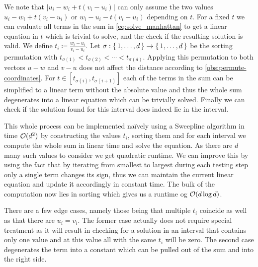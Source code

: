 We note that \(|u_i - w_i + t (v_i - u_i )|\) can only assume the two values \(u_i - w_i + t(v_i - u_i)\) or \(w_i - u_i - t(v_i - u_i)\) depending on \(t\). For a fixed \(t\) we can evaluate all terms in the sum in \cref{eq:solve_manhattan} to get a linear equation in \(t\) which is trivial to solve, and the check if the resulting solution is valid. We define \(t_i \coloneq \frac{w_i - u_i}{v_i - u_i} \). Let \(\sigma:\set{1,\dots, d} \to \set{1,\dots, d}\) be the sorting permutation with \(t_{\sigma(1)} < t_{\sigma(2)} < \cdots < t_{\sigma(d)}\). Applying this permutation to both vectors \(u-w\) and \(v -u\) does not affect the distance according to \cref{obs:permute-coordinates}. For \(t \in [t_{\sigma(i)}, t_{\sigma(i+1)}]\) each of the terms in the sum can be simplified to a linear term without the absolute value and thus the whole sum degenerates into a linear equation which can be trivially solved. Finally we can check if the solution found for this interval does indeed lie in the interval. 

This whole process can be implemented na\"ively using a Sweepline algorithm in time \(\mathcal{O}(d^2)\) by constructing the values \(t_i\), sorting them and for each interval we compute the whole sum in linear time and solve the equation. As there are \(d\) many such values to consider we get quadratic runtime. We can improve this by using the fact that by iterating from smallest to largest during each testing step only a single term changes its sign, thus we can maintain the current linear equation and update it accordingly in constant time. The bulk of the computation now lies in sorting which gives us a runtime og \(\mathcal{O}(d \log d)\). 

There are a few edge cases, namely those being that multiple \(t_i\) coincide as well as that there are \(u_i = v_i\). The former case actually does not require special treatment as it will result in checking for a solution in an interval that contains only one value and at this value all with the same \(t_i\) will be zero. The second case degenerates the term into a constant which can be pulled out of the sum and into the right side.

